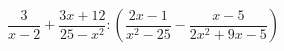 \begin{ex}
	\begin{condition}
		\( \dfrac{3}{x-2}+\dfrac{3x+12}{25-x^2}:\left( \dfrac{2x-1}{x^2-25}-\dfrac{x-5}{2x^2+9x-5} \right) \)
	\end{condition}
\end{ex}